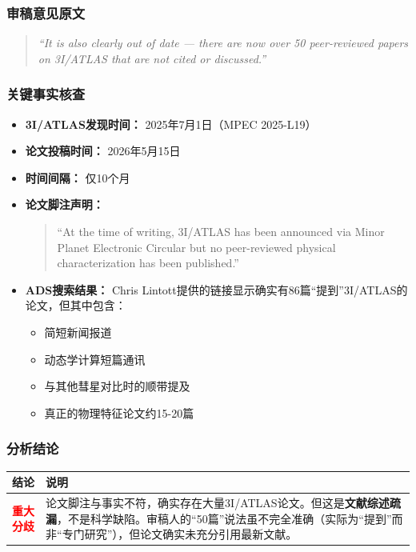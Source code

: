 \documentclass[12pt,a4paper]{article}
\begin{document}
\subsubsection{审稿意见原文}
\begin{quote}
\textit{``It is also clearly out of date — there are now over 50 peer-reviewed papers on 3I/ATLAS that are not cited or discussed.''}
\end{quote}

\subsubsection{关键事实核查}

\begin{itemize}[leftmargin=*]
    \item \textbf{3I/ATLAS发现时间：} 2025年7月1日（MPEC 2025-L19）

    \item \textbf{论文投稿时间：} 2026年5月15日

    \item \textbf{时间间隔：} 仅10个月

    \item \textbf{论文脚注声明：}
    \begin{quote}
    ``At the time of writing, 3I/ATLAS has been announced via Minor Planet Electronic Circular but no peer-reviewed physical characterization has been published.''
    \end{quote}

    \item \textbf{ADS搜索结果：} Chris Lintott提供的链接显示确实有86篇``提到''3I/ATLAS的论文，但其中包含：
    \begin{itemize}
        \item 简短新闻报道
        \item 动态学计算短篇通讯
        \item 与其他彗星对比时的顺带提及
        \item 真正的物理特征论文约15-20篇
    \end{itemize}
\end{itemize}

\subsubsection{分析结论}
\begin{center}
\begin{tabular}{|p{3cm}|p{10cm}|}
\hline
\rowcolor{gray!20}
\textbf{结论} & \textbf{说明} \\
\hline
\textcolor{red}{\textbf{重大分歧}} & 论文脚注与事实不符，确实存在大量3I/ATLAS论文。但这是\textbf{文献综述疏漏}，不是科学缺陷。审稿人的``50篇''说法虽不完全准确（实际为``提到''而非``专门研究''），但论文确实未充分引用最新文献。 \\
\hline
\end{tabular}
\end{center}
\end{document}
